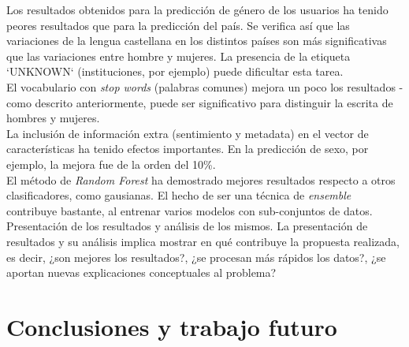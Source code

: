 \documentclass[11pt,a4paper]{article}
\begin{document}
  
  \indent Los resultados obtenidos para la predicci\'on de g\'enero de los usuarios ha tenido peores resultados que para la predicci\'on del pa\'is. Se verifica as\'i que las variaciones de la lengua castellana en los distintos pa\'ises son m\'as significativas que las variaciones entre hombre y mujeres. La presencia de la etiqueta `UNKNOWN` (instituciones, por ejemplo) puede dificultar esta tarea. \\
  \indent El vocabulario con {\em stop words} (palabras comunes) mejora un poco los resultados - como descrito anteriormente, puede ser significativo para distinguir la escrita de hombres y mujeres. \\
  \indent La inclusi\'on de informaci\'on extra (sentimiento y metadata) en el vector de caracter\'isticas ha tenido efectos importantes. En la predicci\'on de sexo, por ejemplo, la mejora fue de la orden del 10\%. \\
  \indent El m\'etodo de {\em Random Forest} ha demostrado mejores resultados respecto a otros clasificadores, como gausianas. El hecho de ser una t\'ecnica de {\em ensemble} contribuye bastante, al entrenar varios modelos con sub-conjuntos de datos.\\


Presentaci\'on de los resultados y an\'alisis de los mismos. La presentaci\'on de resultados y su an\'alisis implica mostrar en qu\'e contribuye la propuesta realizada, es decir, ¿son mejores los resultados?, ¿se procesan m\'as r\'apidos los datos?, ¿se aportan nuevas explicaciones conceptuales al problema?

\section{Conclusiones y trabajo futuro}
  
\end{document}
